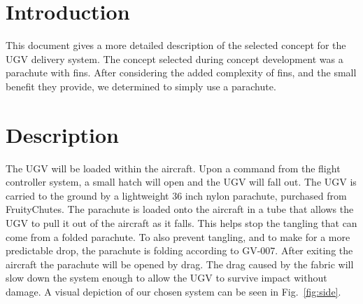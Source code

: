 \documentclass[]{auvsi_doc}
\begin{document}
\begin{AUVSITitlePage}
\begin{artifacttable}
\end{artifacttable}
\end{AUVSITitlePage}

\section{Introduction}
This document gives a more detailed description of the selected concept for the UGV delivery system. The concept selected during concept development was a parachute with fins. After considering the added complexity of fins, and the small benefit they provide, we determined to simply use a parachute.

\section{Description}

The UGV will be loaded within the aircraft.
Upon a command from the flight controller system, a small hatch will open and the UGV will fall out. 
The UGV is carried to the ground by a lightweight 36 inch nylon parachute, purchased from FruityChutes. 
The parachute is loaded onto the aircraft in a tube that allows the UGV to pull it out of the aircraft as it falls. This helps stop the tangling that can come from a folded parachute. To also prevent tangling, and to make for a more predictable drop, the parachute is folding according to GV-007. After exiting the aircraft the parachute will be opened by drag. The drag caused by the fabric will slow down the system enough to allow the UGV to survive impact without damage. A visual depiction of our chosen system can be seen in Fig.~\ref{fig:side}.
\end{document}

